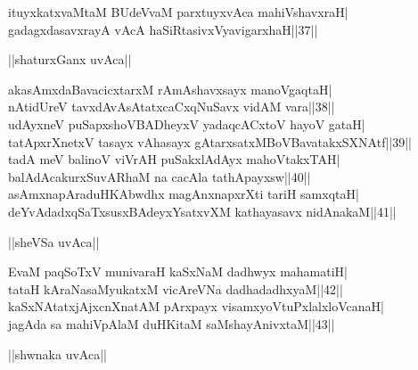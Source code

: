 \documentclass{article}
\begin{document}
ituyxkatxvaMtaM BUdeVvaM parxtuyxvAca mahiVshavxraH|\\
gadagxdasavxrayA vAcA haSiRtasivxVyavigarxhaH||37||\\

\begin{center}
||shaturxGanx uvAca||
\end{center}

akasAmxdaBavacicxtarxM rAmAshavxsayx manoVgaqtaH|\\
nAtidUreV tavxdAvAsAtatxcaCxqNuSavx vidAM vara||38||\\
udAyxneV puSapxshoVBADheyxV yadaqcACxtoV hayoV gataH|\\
tatApxrXnetxV tasayx vAhasayx gAtarxsatxMBoVBavatakxSXNAtf||39||\\
tadA meV balinoV viVrAH puSakxlAdAyx mahoVtakxTAH|\\
balAdAcakurxSuvARhaM na cacAla tathApayxsw||40||\\
asAmxnapAraduHKAbwdhx magAnxnapxrXti tariH samxqtaH|\\
deYvAdadxqSaTxsusxBAdeyxYsatxvXM kathayasavx nidAnakaM||41||\\

\begin{center}
||sheVSa uvAca||
\end{center}

EvaM paqSoTxV munivaraH kaSxNaM dadhwyx mahamatiH|\\
tataH kAraNasaMyukatxM vicAreVNa dadhadadhxyaM||42||\\
kaSxNAtatxjAjxcnXnatAM pArxpayx visamxyoVtuPxlalxloVcanaH|\\
jagAda sa mahiVpAlaM duHKitaM saMshayAnivxtaM||43||\\

\begin{center}
||shwnaka uvAca||
\end{center}
\end{document}
